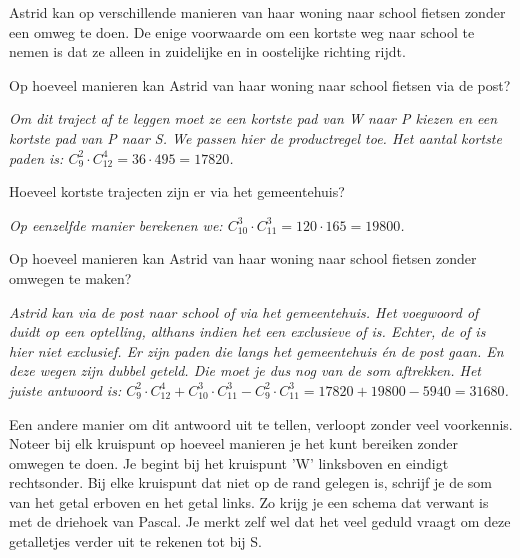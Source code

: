 Astrid kan op verschillende manieren van haar woning naar school fietsen zonder een omweg te doen. De enige voorwaarde om een kortste weg naar school te nemen is dat ze alleen in zuidelijke en in oostelijke richting rijdt.

\begin{werktekstoef}

\item{Op hoeveel manieren kan Astrid van haar woning naar school fietsen via de post?}

\emph{Om dit traject af te leggen moet ze een kortste pad van W naar P kiezen \emph{en} een kortste pad van P naar S. We passen hier de productregel toe. Het aantal kortste paden is: $C_9^2 \cdot C_{12}^4=36 \cdot 495= 17820$.}

\item{Hoeveel kortste trajecten zijn er via het gemeentehuis?}

\emph{Op eenzelfde manier berekenen we: $C_{10}^3 \cdot C_{11}^3=120 \cdot 165= 19800$.}

\item{Op hoeveel manieren kan Astrid van haar woning naar school fietsen zonder omwegen te maken?}

\emph{Astrid kan via de post naar school of via het gemeentehuis. Het voegwoord \emph{of} duidt op een optelling, althans indien het een exclusieve \emph{of} is. Echter, de \emph{of} is hier niet exclusief. Er zijn paden die langs het gemeentehuis én de post gaan. En deze wegen zijn  dubbel geteld. Die moet je dus nog van de som aftrekken. Het juiste antwoord is: $C_9^2 \cdot C_{12}^4+C_{10}^3 \cdot C_{11}^3-C_9^2 \cdot C_{11}^3=17820+19800-5940=31680$. }

\end{werktekstoef}

Een andere manier om dit antwoord uit te tellen, verloopt zonder veel voorkennis. Noteer bij elk kruispunt op hoeveel manieren je het kunt bereiken zonder omwegen te doen. Je begint bij het kruispunt 'W' linksboven en eindigt rechtsonder. Bij elke kruispunt dat niet op de rand gelegen is, schrijf je de som van het getal erboven en het getal links. Zo krijg je een schema dat verwant is met de driehoek van Pascal. Je merkt zelf wel dat het veel geduld vraagt om deze getalletjes verder uit te rekenen tot bij S.

